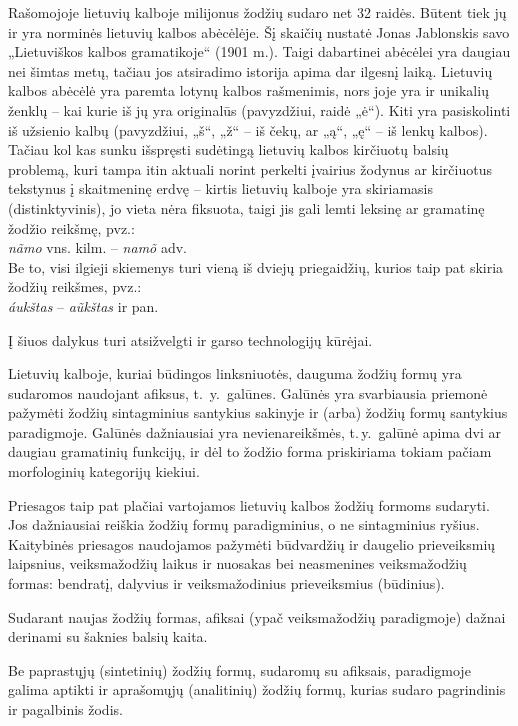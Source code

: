 \begin{multicols}{2}
Rašomojoje lietuvių kalboje milijonus žodžių sudaro net 32 raidės. Būtent tiek jų ir yra norminės lietuvių kalbos abėcėlėje. Šį skaičių nustatė Jonas Jablonskis savo „Lietuviškos kalbos gramatikoje“ (1901 m.). Taigi dabartinei abėcėlei yra daugiau nei šimtas metų, tačiau jos atsiradimo istorija apima dar ilgesnį laiką. Lietuvių kalbos abėcėlė yra paremta lotynų kalbos rašmenimis, nors joje yra ir unikalių ženklų – kai kurie iš jų yra originalūs (pavyzdžiui, raidė „ė“). Kiti yra pasiskolinti iš užsienio kalbų (pavyzdžiui, „š“, „ž“ – iš čekų,  ar „ą“, „ę“ – iš lenkų kalbos). Tačiau kol kas sunku išspręsti sudėtingą lietuvių kalbos kirčiuotų balsių problemą, kuri tampa itin aktuali norint perkelti įvairius žodynus ar kirčiuotus tekstynus į skaitmeninę erdvę – kirtis lietuvių kalboje yra skiriamasis (distinktyvinis), jo vieta nėra fiksuota, taigi jis gali lemti leksinę ar gramatinę žodžio reikšmę, pvz.:\\
    \textit{nãmo} vns. kilm. – \textit{namõ} adv. \\
    Be to, visi ilgieji skiemenys turi vieną iš dviejų priegaidžių, kurios taip pat skiria žodžių reikšmes, pvz.:\\
    \textit{áukštas} – \textit{aũkštas}  ir pan.

    Į šiuos dalykus turi atsižvelgti ir garso technologijų kūrėjai.
    
    Lietuvių kalboje, kuriai būdingos linksniuotės, dauguma žodžių formų yra sudaromos naudojant afiksus, t.~y.~galūnes. Galūnės yra svarbiausia priemonė pažymėti žodžių sintagminius santykius sakinyje ir (arba) žodžių formų santykius paradigmoje.   Galūnės dažniausiai yra nevienareikšmės, t.\,y.~galūnė apima dvi ar daugiau gramatinių funkcijų, ir dėl to žodžio forma priskiriama tokiam pačiam morfologinių kategorijų kiekiui.
   
Priesagos taip pat plačiai vartojamos lietuvių kalbos žodžių formoms sudaryti. Jos dažniausiai reiškia žodžių formų paradigminius, o ne sintagminius ryšius. Kaitybinės priesagos naudojamos pažymėti būdvardžių ir daugelio prieveiksmių laipsnius, veiksmažodžių laikus ir nuosakas bei neasmenines veiksmažodžių formas: bendratį, dalyvius ir veiksmažodinius prieveiksmius (būdinius).

Sudarant naujas žodžių formas, afiksai (ypač veiksmažodžių paradigmoje) dažnai derinami su šaknies balsių kaita.

Be paprastųjų (sintetinių) žodžių formų, sudaromų su afiksais, paradigmoje galima aptikti ir aprašomųjų (analitinių) žodžių formų, kurias sudaro pagrindinis ir pagalbinis žodis.


\end{multicols}
